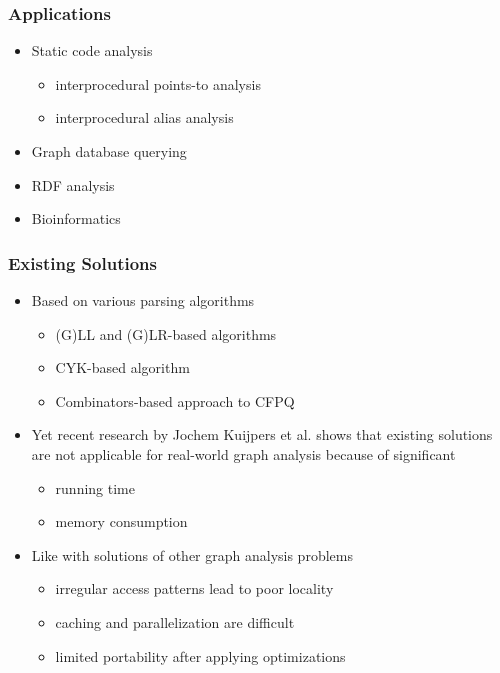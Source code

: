 \documentclass[xcolor=table,aspectratio=169]{beamer}
\begin{document}
  \begin{frame}[fragile] \frametitle{Applications}
    \begin{itemize}
      \item Static code analysis
       \begin{itemize}
      	\item interprocedural points-to analysis
      	\item interprocedural alias analysis
      \end{itemize}
      \item Graph database querying
      \item RDF analysis
      \item Bioinformatics
    \end{itemize}
  \end{frame}

\begin{frame}[fragile] \frametitle{Existing Solutions}
	\begin{itemize}
		\item Based on various parsing algorithms
		\begin{itemize}
			\item (G)LL and (G)LR-based algorithms%
			\item CYK-based algorithm%
			\item Combinators-based approach to CFPQ%
		\end{itemize}
		\item Yet recent research by Jochem
		Kuijpers et al. shows that existing solutions are not applicable
		for real-world graph analysis because of significant
		\begin{itemize}
			\item running time
			\item memory consumption
		\end{itemize}
		\item Like with solutions of other graph analysis problems
		\begin{itemize}
			\item irregular access patterns lead to poor locality
			\item caching and parallelization are difficult
			\item limited portability after applying optimizations
		\end{itemize}
	\end{itemize}
\end{frame}
\end{document}
